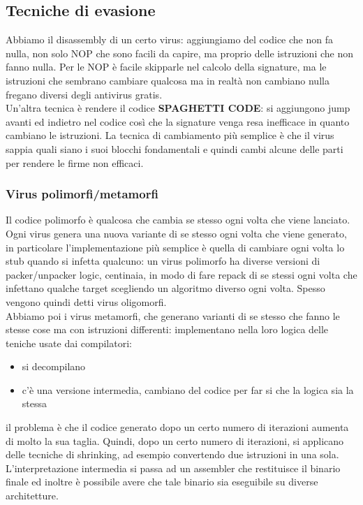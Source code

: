 \documentclass[12pt, oneside]{extbook} %
\begin{document}
\subsection{Tecniche di evasione}
Abbiamo il disassembly di un certo virus:
aggiungiamo del codice che non fa nulla, non solo NOP che sono facili da capire, ma proprio delle istruzioni che non fanno nulla. Per le NOP è facile skipparle nel calcolo della signature, ma le istruzioni che sembrano cambiare qualcosa ma in realtà non cambiano nulla fregano diversi degli antivirus gratis.\\Un'altra tecnica è rendere il codice \textbf{\textsf{SPAGHETTI CODE}}: si aggiungono jump avanti ed indietro nel codice così che la signature venga resa inefficace in quanto cambiano le istruzioni. La tecnica di cambiamento più semplice è che il virus sappia quali siano i suoi blocchi fondamentali e quindi cambi alcune delle parti per rendere le firme non efficaci.
\subsubsection{Virus polimorfi/metamorfi}
Il codice polimorfo è qualcosa che cambia se stesso ogni volta che viene lanciato. Ogni virus genera una nuova variante di se stesso ogni volta che viene generato, in particolare l'implementazione più semplice è quella di cambiare ogni volta lo stub quando si infetta qualcuno: un virus polimorfo ha diverse versioni di packer/unpacker logic, centinaia, in modo di fare repack di se stessi ogni volta che infettano qualche target scegliendo un algoritmo diverso ogni volta. Spesso vengono quindi detti virus oligomorfi.\\Abbiamo poi i virus metamorfi, che generano varianti di se stesso che fanno le stesse cose ma con istruzioni differenti: implementano nella loro logica delle teniche usate dai compilatori:
\begin{itemize}
\item si decompilano
\item c'è una versione intermedia, cambiano del codice per far si che la logica sia la stessa
\end{itemize}
il problema è che il codice generato dopo un certo numero di iterazioni aumenta di molto la sua taglia. Quindi, dopo un certo numero di iterazioni, si applicano delle tecniche di shrinking, ad esempio convertendo due istruzioni in una sola. L'interpretazione intermedia si passa ad un assembler che restituisce il binario finale ed inoltre è possibile avere che tale binario sia eseguibile su diverse architetture.
\end{document}
